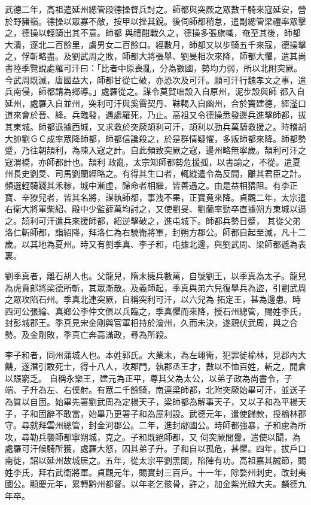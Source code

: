 \begin{pinyinscope}
 武德二年，高祖遣延州總管段德操督兵討之。師都與突厥之眾數千騎來寇延安，營於野豬嶺。德操以眾寡不敵，按甲以挫其銳。後伺師都稍怠，遣副總管梁禮率眾擊之，德操以輕騎出其不意。師都
 與禮酣戰久之，德操多張旗幟，奄至其後，師都大潰，逐北二百餘里，虜男女二百餘口。經數月，師都又以步騎五千來寇，德操擊之，俘斬略盡。及劉武周之敗，師都大將張舉、劉旻相次來降，師都大懼，遣其尚書陸季覽說處羅可汗曰：「比者中原喪亂，分為數國，勢均力弱，所以北附突厥。今武周既滅，唐國益大，師都甘從亡破，亦恐次及可汗。願可汗行魏孝文之事，遣兵南侵，師都請為鄉導。」處羅從之。謀令莫賀咄設入自原州，泥步設與師
 都入自延州，處羅入自並州，突利可汗與奚霫契丹、靺鞨入自幽州，合於竇建德，經滏口道來會於晉、絳。兵臨發，遇處羅死，乃止。高祖又令德操悉發邊兵進擊師都，拔其東城。師都退據西城，又求救於突厥頡利可汗，頡利以勁兵萬騎救援之。時稽胡大帥劉ＧＣ成率眾降師都，師都信讒殺之，於是群情疑懼，多叛師都來降。師都勢蹙，乃往朝頡利，為陳入寇之計。自此頻致突厥之寇，邊州略無寧歲。頡利可汗之寇渭橋，亦師都計也。頡利
 政亂，太宗知師都勢危援孤，以書諭之，不從。遣夏州長史劉旻、司馬劉蘭經略之。有得其生口者，輒縱遣令為反間，離其君臣之計。頻選輕騎踐其禾稼，城中漸虛，歸命者相繼，皆善遇之。由是益相猜阻。有李正寶、辛獠兒者，皆其名將，謀執師都，事洩不果，正寶竟來降。貞觀二年，太宗遣右衛大將軍柴紹、殿中少監薛萬均討之，又使劉旻、劉蘭率勁卒直據朔方東城以逼之。頡利可汗遣兵來援師都，紹逆擊破之，進屯城下。師都兵勢日蹙，
 其從父弟洛仁斬師都，詣紹降，拜洛仁為右驍衛將軍，封朔方郡公。師都自起至滅，凡十二歲。以其地為夏州。時又有劉季真、李子和，屯據北邊，與劉武周、梁師都遞為表裏。



 劉季真者，離石胡人也。父龍兒，隋末擁兵數萬，自號劉王，以季真為太子。龍兒為虎賁郎將梁德所斬，其眾漸散。及義師起，季真與弟六兒復舉兵為盜，引劉武周之眾攻陷石州。季真北連突厥，自稱突利可汗，以六兒為
 拓定王，甚為邊患。時西河公張綸、真鄉公李仲文俱以兵臨之，季真懼而來降，授石州總管，賜姓李氏，封彭城郡王。季真見宋金剛與官軍相持於澮州，久而未決，遂親伏武周，與之合勢。及金剛敗，季真亡奔高滿政，尋為所殺。



 李子和者，同州蒲城人也。本姓郭氏。大業末，為左翊衛，犯罪徙榆林，見郡內大饑，遂潛引敢死士，得十八人，攻郡門，執郡丞王才，數以不恤百姓，斬之，開倉以賑窮乏。
 自稱永樂王，建元為正平，尊其父為太公，以弟子政為尚書令，子端、子升為左、右僕射。有眾二千餘騎，南連梁師都，北附突厥始畢可汗，並送子為質以自固。始畢先署劉武周為定楊天子，梁師都為解事天子，又以子和為平楊天子，子和固辭不敢當，始畢乃更署子和為屋利設。武德元年，遣使歸款，授榆林郡守。尋就拜雲州總管，封金河郡公。二年，進封郕國公。時師都強暴，子和慮為所攻，尋勒兵襲師都寧朔城，克之。子和既絕師都，又
 伺突厥間釁，遣使以聞，為處羅可汗候騎所獲，處羅大怒，囚其弟子升。子和自以孤危，甚懼。四年，拔戶口南徙，詔以延州故城居之。五年，從太宗平劉黑闥，陷陣有功。高祖嘉其誠節，賜姓李氏，拜右武衛將軍。貞觀元年，賜實封三百戶。十一年，除婺州刺史，改封夷國公。顯慶元年，累轉黔州都督。以年老乞骸骨，許之，加金紫光祿大夫。麟德九年卒。




\end{pinyinscope}
